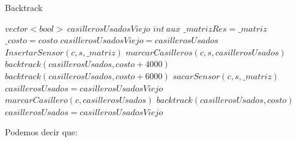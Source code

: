 \begin{algorithm}[H]
\caption{Backtrack}\label{Backtrack}
\begin{algorithmic}[1]
	\State $vector<bool>\ casillerosUsadosViejo$ %
	\State $int\ aux$
			\State $\_matrizRes=\_matriz$ %
			\State $\_costo=costo $ %
		\EndIf
	\Else
			\State $casillerosUsadosViejo = casillerosUsados$ %
							\State $InsertarSensor(c,s,\_matriz)$ 
							\State $marcarCasilleros(c,s,casillerosUsados)$
								\State $backtrack(casillerosUsados,costo+4000)$
							\Else
								\State $backtrack(casillerosUsados,costo+6000)$
							\EndIf
							\State $sacarSensor(c,s,\_matriz)$ 
							\State $casillerosUsados=casillerosUsadosViejo$
						\EndIf
					\EndFor
					\State $marcarCasillero(c,casillerosUsados)$
					\State $backtrack(casillerosUsados,costo)$
					\State $casillerosUsados=casillerosUsadosViejo$
				\EndIf
			\EndFor
		\EndIf
	\EndIf	
\EndProcedure
\end{algorithmic}
\end{algorithm}

Podemos decir que:

